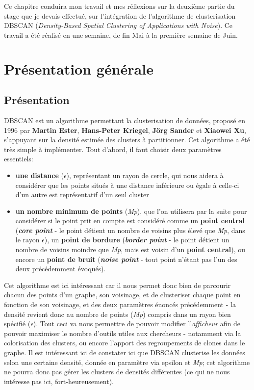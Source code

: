 \documentclass[12pt]{report}
\begin{document}
\begin{spacing}{1.2}
Ce chapitre conduira mon travail et mes réflexions sur la deuxième partie du stage que je devais effectué, sur l'intégration de l'algorithme de clusterisation DBSCAN (\textit{Density-Based Spatial Clustering of Applications with Noise}).
\newline
Ce travail a été réalisé en une semaine, de fin Mai à la première semaine de Juin.

\section{Présentation générale}

\subsection{Présentation}
DBSCAN est un algorithme permettant la clusterisation de données, proposé en 1996 par \textbf{Martin Ester}, \textbf{Hans-Peter Kriegel}, \textbf{Jörg Sander} et \textbf{Xiaowei Xu}, s'appuyant sur la densité estimée des clusters à partitionner.
\newline
Cet algorithme a été très simple à implémenter.
\newline
Tout d'abord, il faut choisir deux paramètres essentiels:
\begin{itemize}
\item \textbf{une distance} ($\epsilon$), représentant un rayon de cercle, qui nous aidera à considérer que les points situés à une distance inférieure ou égale à celle-ci d'un autre est représentatif d'un seul cluster
\item \textbf{un nombre minimum de points} (\textit{Mp}), que l'on utilisera par la suite pour considérer si le point prit en compte est considéré comme un \textbf{point central} (\textit{\textbf{core point}} - le point détient un nombre de voisins plus élevé que \textit{Mp}, dans le rayon $\epsilon$), un \textbf{point de bordure} (\textit{\textbf{border point}} - le point détient un nombre de voisins moindre que \textit{Mp}, mais est voisin d'un \textbf{point central}), ou encore un \textbf{point de bruit} (\textit{\textbf{noise point}} - tout point n'étant pas l'un des deux précédemment évoqués).
\end{itemize}
Cet algorithme est ici intéressant car il nous permet donc bien de parcourir chacun des points d'un graphe, son voisinage, et de clusteriser chaque point en fonction de son voisinage, et des deux paramètres énoncés précédemment - la densité revient donc au nombre de points (\textit{Mp}) compris dans un rayon bien spécifié ($\epsilon$). Tout ceci va nous permettre de pouvoir modifier l'\textit{afficheur} afin de pouvoir maximiser le nombre d'outils utiles aux chercheurs - notamment via la colorisation des clusters, ou encore l'apport des regroupements de clones dans le graphe.
\newline
Il est intéressant ici de constater ici que DBSCAN clusterise les données selon une certaine densité, donnée en paramètre via epsilon et \textit{Mp}; cet algorithme ne pourra donc pas gérer les clusters de densités différentes (ce qui ne nous intéresse pas ici, fort-heureusement).


\end{spacing}
\end{document}
